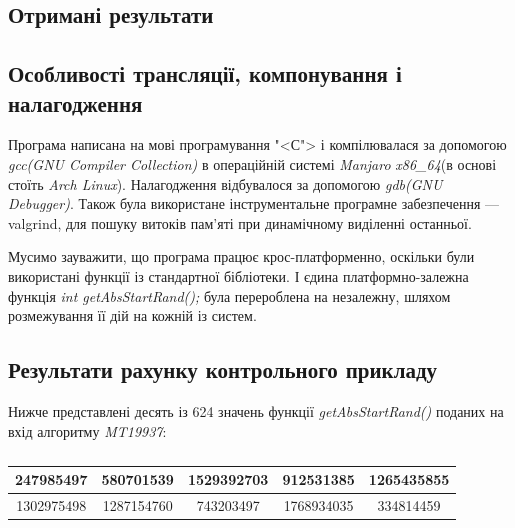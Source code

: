 \documentclass[oneside,final,14pt]{extreport}
\begin{document}
\begin{large}
\chapter{Отримані результати}\label{c:6}
\section{Особливості трансляції, компонування і налагодження}\label{s:61}
	Програма написана на мові програмування "<С"> і компілювалася за 
	допомогою {\itshape gcc(GNU Compiler Collection)} в операційній системі {\itshape Manjaro} 
	{\itshape x86\_64}(в основі стоїть {\itshape Arch Linux}).
	Налагодження відбувалося за допомогою {\itshape gdb(GNU Debugger)}. Також була 
	використане інструментальне програмне забезпечення --- valgrind, для пошуку 
	витоків пам'яті при динамічному виділенні останньої.
	
	Мусимо зауважити, що програма працює крос-платформенно, 
	оскільки були використані функції із стандартної бібліотеки. І єдина 
	платформно-залежна функція {\itshape int getAbsStartRand();} була перероблена на незалежну, 
	шляхом розмежування її дій на кожній із систем.
\section{Результати рахунку контрольного прикладу}\label{s:62}
Нижче представлені десять із 624 значень функції {\itshape getAbsStartRand()} поданих 
на вхід алгоритму {\itshape MT19937}: \\
\begin{table}[H]
	\centering
\begin{tabular}{|c|c|c|c|c|}
	\hline 247985497  & 580701539 &  1529392703 &  912531385 &  1265435855 \\ \hline 
	 1302975498  & 1287154760  & 743203497 &  1768934035 &  334814459 \\ \hline
\end{tabular}
\caption{}
\label{t:62}
\end{table}



\end{large}
\end{document}
